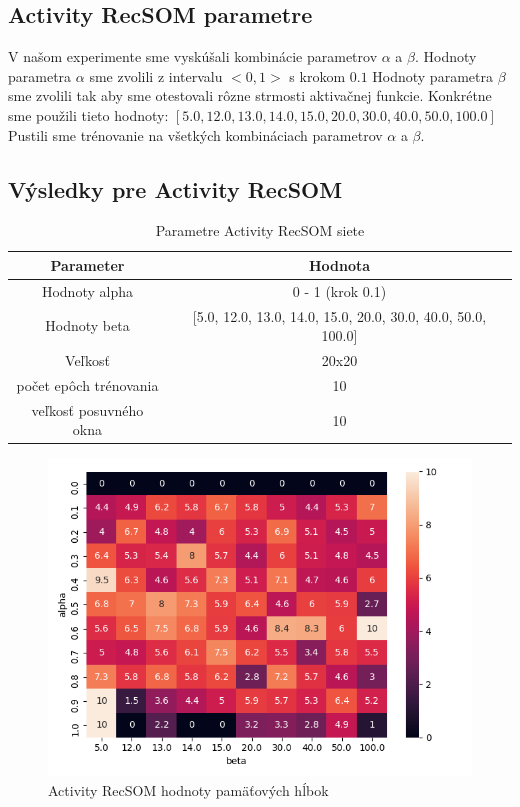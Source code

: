 \subsection{Activity RecSOM parametre}
V našom experimente sme vyskúšali kombinácie parametrov $\alpha$ a $\beta$.
Hodnoty parametra $\alpha$ sme zvolili z intervalu $<0, 1>$ s krokom $0.1$
Hodnoty parametra $\beta$ sme zvolili tak aby sme otestovali rôzne strmosti aktivačnej funkcie.
Konkrétne sme použili tieto hodnoty: $[5.0, 12.0, 13.0, 14.0, 15.0, 20.0, 30.0, 40.0, 50.0, 100.0]$
Pustili sme trénovanie na všetkých kombináciach parametrov $\alpha$ a $\beta$.

\subsection{Výsledky pre Activity RecSOM}

\begin{table}[h!]
    \centering
    \begin{tabular}{|c|c|} 
     \hline
     Parameter & Hodnota \\ 
     \hline\hline
     Hodnoty alpha & 0 - 1 (krok 0.1) \\ 
     \hline
     Hodnoty beta & [5.0, 12.0, 13.0, 14.0, 15.0, 20.0, 30.0, 40.0, 50.0, 100.0]\\ 
     \hline
     Veľkosť & 20x20  \\
     \hline
     počet epôch trénovania & 10  \\
     \hline
     veľkosť posuvného okna & 10  \\
     \hline
    \end{tabular}
    \caption{Parametre Activity RecSOM siete}
    \label{table:1}
    \end{table}
    
    \begin{figure}[H]
        \centering
        \includegraphics[width=\textwidth]{assets/activity_recsom_memory_span}
        \caption{Activity RecSOM hodnoty pamäťových hĺbok}
    \end{figure}
    
